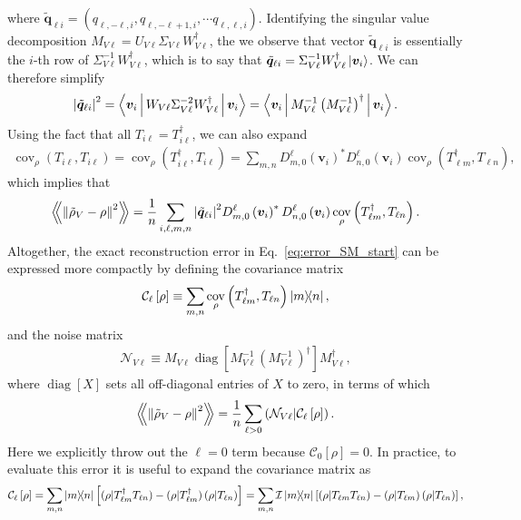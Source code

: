 \documentclass[notitlepage,twocolumn]{revtex4-2}
\newcommand{\f}[2]{\dfrac{#1}{#2}} %
\newcommand{\p}[1]{\left(#1\right)} %
\renewcommand{\sp}[1]{\left[#1\right]} %
\newcommand{\bk}{\Braket} %
\renewcommand{\v}{\bm} %
\newcommand{\Bbk}[1]
{\left\langle\!\!\left\langle #1 \right\rangle\!\!\right\rangle}
\newcommand{\C}{\mathcal{C}}
\newcommand{\I}{\mathcal{I}}
\newcommand{\N}{\mathcal{N}}
\def\obk#1{\mathinner{({#1})}}
\DeclareMathOperator{\cov}{cov}
\DeclareMathOperator{\diag}{diag}
\begin{document}
where $\tilde{\v q}_{\ell i} = (q_{\ell,-\ell,i},q_{\ell,-\ell+1,i},\cdots q_{\ell,\ell,i})$.
Identifying the singular value decomposition $M_{V\ell} = U_{V\ell} \Sigma_{V\ell} W_{V\ell}^\dag$, the we observe that vector $\tilde{\v q}_{\ell i}$ is essentially the $i$-th row of $\Sigma_{V\ell}^{-1} W_{V\ell}^\dag$, which is to say that $\tilde{\v q}_{\ell i} = \Sigma_{V\ell}^{-1} W_{V\ell}^\dag \ket{\v v_i}$.
We can therefore simplify
\begin{align}
  \abs{\tilde{\v q}_{\ell i}}^2
  = \bk{\v v_i | W_{V\ell} \Sigma_{V\ell}^{-2} W_{V\ell}^\dag | \v v_i}
  = \bk{\v v_i| M_{V\ell}^{-1} \p{M_{V\ell}^{-1}}^\dag | \v v_i}.
\end{align}
Using the fact that all $T_{i\ell}=T_{i\ell}^\dag$, we can also expand
\begin{align}
  \cov_\rho\p{T_{i\ell},T_{i\ell}}
  = \cov_\rho\p{T_{i\ell}^\dag,T_{i\ell}}
  = \sum_{m,n} D^\ell_{m,0}\p{\v v_i}^* D^\ell_{n,0}\p{\v v_i}
  \cov_\rho\p{T_{\ell m}^\dag, T_{\ell n}},
\end{align}
which implies that
\begin{align}
  \Bbk{\norm{\tilde\rho_V-\rho}^2}
  = \f1n \sum_{i,\ell,m,n}
  \abs{\tilde{\v q}_{\ell i}}^2
  D^\ell_{m,0}\p{\v v_i}^* D^\ell_{n,0}\p{\v v_i}
  \cov_\rho\p{T_{\ell m}^\dag, T_{\ell n}}.
\end{align}
Altogether, the exact reconstruction error in Eq.~\eqref{eq:error_SM_start} can be expressed more compactly by defining the covariance matrix
\begin{align}
  \C_\ell\sp{\rho} \equiv
  \sum_{m,n} \cov_\rho\p{T_{\ell m}^\dag, T_{\ell n}} \op{m}{n},
\end{align}
and the noise matrix
\begin{align}
  \N_{V\ell} \equiv M_{V\ell} \diag\sp{M_{V\ell}^{-1}
    \p{M_{V\ell}^{-1}}^\dag} M_{V\ell}^\dag,
\end{align}
where $\diag\sp{X}$ sets all off-diagonal entries of $X$ to zero, in terms of which
\begin{align}
  \Bbk{\norm{\tilde\rho_V-\rho}^2}
  = \f1n \sum_{\ell>0} \obk{\N_{V\ell}|\C_\ell\sp{\rho}}.
  \label{eq:error_SM}
\end{align}
Here we explicitly throw out the $\ell=0$ term because $\C_0\sp{\rho}=0$.
In practice, to evaluate this error it is useful to expand the covariance matrix as
\begin{align}
  \C_\ell\sp{\rho}
  = \sum_{m,n} \op{m}{n} \sp{\obk{\rho|T_{\ell m}^\dag T_{\ell n}}
    - \obk{\rho|T_{\ell m}^\dag} \obk{\rho|T_{\ell n}}}
  = \sum_{m,n} \I\op{m}{n} \sp{\obk{\rho|T_{\ell m} T_{\ell n}}
    - \obk{\rho|T_{\ell m}} \obk{\rho|T_{\ell n}}},
\end{align}
\end{document}
